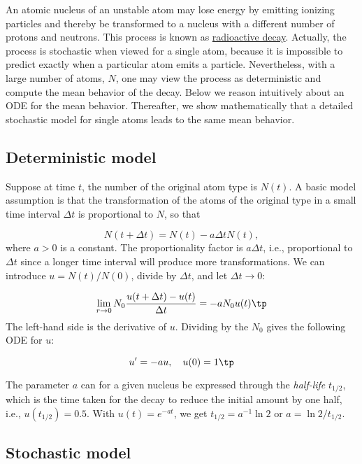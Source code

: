 \documentclass[graybox,sectrefs,envcountresetchap,open=right,final]{svmonodo}
\begin{document}

An atomic nucleus of an unstable atom may lose energy by emitting
ionizing particles and thereby be transformed to a nucleus with a
different number of protons and neutrons.  This process is known as
\href{{http://en.wikipedia.org/wiki/Radioactive_decay}}{radioactive decay}.
Actually, the process is stochastic when viewed for a single atom,
because it is impossible to predict exactly when a particular atom
emits a particle. Nevertheless, with a large number of atoms, $N$, one
may view the process as deterministic and compute the mean behavior of
the decay. Below we reason intuitively about an ODE for the mean
behavior. Thereafter, we show mathematically that a detailed stochastic model
for single atoms leads to the same mean behavior.

\subsection{Deterministic model}

Suppose at time $t$, the number of the original atom type is $N(t)$.
A basic model assumption is that the transformation of the atoms of the original
type in a small time interval $\Delta t$ is proportional to
$N$, so that

\[ N(t+\Delta t) = N(t) - a\Delta t N(t),\]
where $a>0$ is a constant. The proportionality factor is $a\Delta t$, i.e.,
proportional to $\Delta t$ since a longer time interval will produce more
transformations.
We can introduce $u=N(t)/N(0)$, divide by
$\Delta t$, and let $\Delta t\rightarrow 0$:

\[ \lim_{r\rightarrow 0}
N_0\frac{u(t+\Delta t) - u(t)}{\Delta t} = - a N_0 u(t)\tp\]
The left-hand side is the derivative of $u$. Dividing by the $N_0$ gives
the following ODE for $u$:

\begin{equation}
u^{\prime} = -au,\quad u(0)=1
\tp
\end{equation}

The parameter $a$ can for a given nucleus be expressed through the
\emph{half-life} $t_{1/2}$, which is the time taken for the decay to reduce the
initial amount by one half, i.e., $u(t_{1/2}) = 0.5$.
With $u(t)=e^{-at}$, we get $t_{1/2}=a^{-1}\ln 2$ or $a=\ln 2/t_{1/2}$.


\subsection{Stochastic model}
\end{document}
